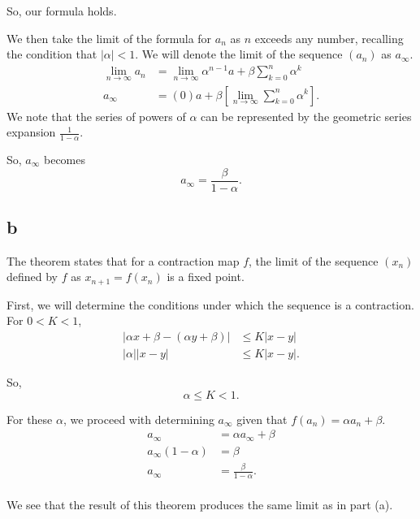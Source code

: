 \documentclass{article}
\begin{document}
So, our formula holds.

We then take the limit of the formula for $a_n$ as $n$ exceeds any number, recalling the condition that $|\alpha|<1$. We will denote the limit of the sequence $(a_n)$ as $a_{\infty}$.
\begin{align*}
    \lim\limits_{n\to\infty} a_n &= \lim\limits_{n\to\infty} \alpha^{n-1}a+\beta\sum\limits_{k=0}^{n}\alpha^k \\
    a_{\infty} &= (0)a+\beta\left[\lim\limits_{n\to\infty}\sum\limits_{k=0}^{n}\alpha^k\right].
\end{align*}
We note that the series of powers of $\alpha$ can be represented by the geometric series expansion $\frac{1}{1-\alpha}$.

So, $a_{\infty}$ becomes \[a_{\infty} = \frac{\beta}{1-\alpha}.\]

\subsection*{b}

The theorem states that for a contraction map $f$, the limit of the sequence $(x_n)$ defined by $f$ as $x_{n+1}=f(x_n)$ is a fixed point. 

First, we will determine the conditions under which the sequence is a contraction. For $0<K<1$,
\begin{align*}
    |\alpha x+\beta - (\alpha y + \beta)| &\leq K|x-y| \\
    |\alpha||x-y|&\leq K|x-y|.
\end{align*}

So, \[\alpha\leq K < 1.\]

For these $\alpha$, we proceed with determining $a_{\infty}$ given that $f(a_n)=\alpha a_n + \beta$.
\begin{align*}
    a_{\infty} &= \alpha a_{\infty} + \beta \\
    a_{\infty}(1-\alpha)&=\beta\\
    a_{\infty}&=\frac{\beta}{1-\alpha}.\\
\end{align*}

We see that the result of this theorem produces the same limit as in part (a).
\end{document}
